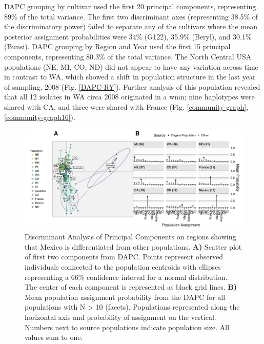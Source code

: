 \documentclass[fleqn,10pt,lineno]{wlpeerj} %
\theoremstyle{definition}
\theoremstyle{definition}
\theoremstyle{definition}
\theoremstyle{remark}
\begin{document}
DAPC grouping by cultivar used the first 20 principal components,
representing 89\% of the total variance. The first two discriminant axes
(representing 38.5\% of the discriminatory power) failed to separate any
of the cultivars where the mean posterior assignment probabilities were
34\% (G122), 35.9\% (Beryl), and 30.1\% (Bunsi). DAPC grouping by Region
and Year used the first 15 principal components, representing 80.3\% of
the total variance. The North Central USA populations (NE, MI, CO, ND)
did not appear to have any variation across time in contrast to WA,
which showed a shift in population structure in the last year of
sampling, 2008 (Fig. \ref{DAPC-RY}). Further analysis of this population
revealed that all 12 isolates in WA circa 2008 originated in a wmn; nine
haplotypes were shared with CA, and three were shared with France (Fig.
\ref{community-graph}, \ref{community-graph16}).

\begin{figure}
\centering
\includegraphics[width=1.00000\textwidth]{../../results/figures/publication/DAPC.pdf}
\caption{Discriminant Analysis of Principal Components on regions
showing that Mexico is differentiated from other populations.
\textbf{A)} Scatter plot of first two components from DAPC. Points
represent observed individuals connected to the population centroids
with ellipses representing a 66\% confidence interval for a normal
distribution. The center of each component is represented as black grid
lines. \textbf{B)} Mean population assignment probability from the DAPC
for all populations with N \textgreater{} 10 (facets). Populations
represented along the horizontal axis and probability of assignment on
the vertical. Numbers next to source populations indicate population
size. All values sum to one.}\label{DAPC}
\end{figure}
\end{document}
